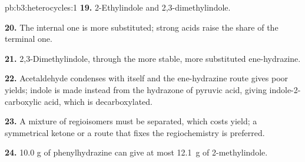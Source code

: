 \begin{solution}{pb:b3:heterocycles:1}
\textbf{19.} 2-Ethylindole and 2,3-dimethylindole.

\textbf{20.} The internal one is more substituted; strong acids raise the share of the
terminal one.

\textbf{21.} 2,3-Dimethylindole, through the more stable, more substituted
ene-hydrazine.

\textbf{22.} Acetaldehyde condenses with itself and the ene-hydrazine route gives poor
yields; indole is made instead from the hydrazone of pyruvic acid, giving
indole-2-carboxylic acid, which is decarboxylated.

\textbf{23.} A mixture of regioisomers must be separated, which costs yield; a
symmetrical ketone or a route that fixes the regiochemistry is preferred.

\textbf{24.} 10.0 g of phenylhydrazine can give at most \qty{12.1}{g} of 2-methylindole.
\end{solution}
